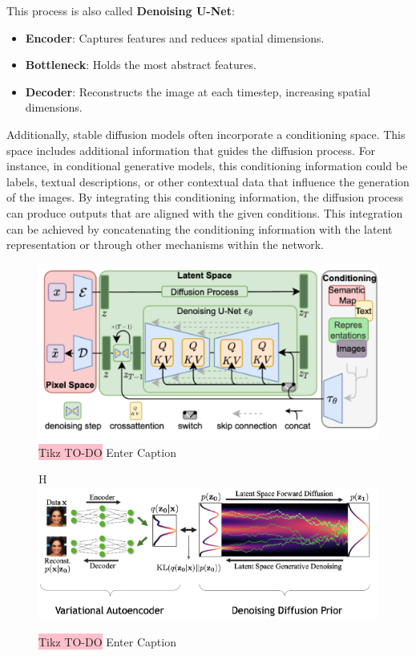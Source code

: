 This process is also called \textbf{Denoising U-Net}:

\begin{itemize}
    \item \textbf{Encoder}: Captures features and reduces spatial dimensions.
    \item \textbf{Bottleneck}: Holds the most abstract features.
    \item \textbf{Decoder}: Reconstructs the image at each timestep, increasing spatial dimensions.
\end{itemize}


Additionally, stable diffusion models often incorporate a conditioning space. This space includes additional information that guides the diffusion process. For instance, in conditional generative models, this conditioning information could be labels, textual descriptions, or other contextual data that influence the generation of the images. By integrating this conditioning information, the diffusion process can produce outputs that are aligned with the given conditions. This integration can be achieved by concatenating the conditioning information with the latent representation or through other mechanisms within the network.



\begin{figure}[H]
    \centering
    \includegraphics[width=\linewidth]{tikz/A.png}
    \caption{{\color{red}\colorbox{pink}{Tikz TO-DO}} Enter Caption}
    \label{fig:enter-label}
\end{figure}


\begin{figure}{H}
    \centering
    \includegraphics[width=\linewidth]{tikz/B.png}
    \caption{{\color{red}\colorbox{pink}{Tikz TO-DO}} Enter Caption}
    \label{fig:enter-label}
\end{figure}


